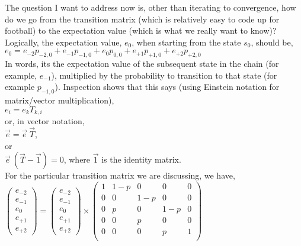 \documentclass{article}
\begin{document}
The question I want to address now is, other than iterating to convergence, how do we go from the transition matrix (which is relatively easy to code up for football) to the expectation value (which is what we really want to know)? 
Logically, the expectation value, $e_{0}$, when starting from the state $s_{0}$, should be, \\

$
e_0 = e_{-2} p_{-2,0} + e_{-1} p_{-1,0} + e_{0} p_{0,0} + e_{+1} p_{+1,0} + e_{+2} p_{+2,0}
$ \\

In words, its the expectation value of the subsequent state in the chain (for example, $ e_{-1}$), multiplied by the probability to transition to that state (for example $ p_{-1, 0}$). Inspection shows that this says (using Einstein notation for matrix/vector multiplication), \\

$ 
e_{i} = e_{k} T_{k,i} 
$ \\

or, in vector notation, \\

$ \vec{e} = \vec {e} ~\vec{T}$, \\ 

or \\

$ \vec{e} ~(\vec{T} - \vec{1}) = 0$, where $ \vec{1}$ is the identity matrix. \\

For the particular transition matrix we are discussing, we have, \\

$
\left(
\begin{array}{c}
e_{-2} \\
e_{-1} \\
e_{0} \\
e_{+1} \\
e_{+2}
\end{array}
\right) = 
\left(
\begin{array}{c}
e_{-2} \\
e_{-1} \\
e_{0} \\
e_{+1} \\
e_{+2}
\end{array}
\right)
\times 
\left(
\begin{array}{ccccc}
 1 & 1-p & 0 & 0 & 0 \\
 0 & 0 & 1-p & 0 & 0 \\
 0 & p & 0 & 1-p & 0 \\
 0 & 0 & p & 0 & 0 \\
 0 & 0 & 0 & p & 1 \\
\end{array}
\right)
$ \\
\end{document}
